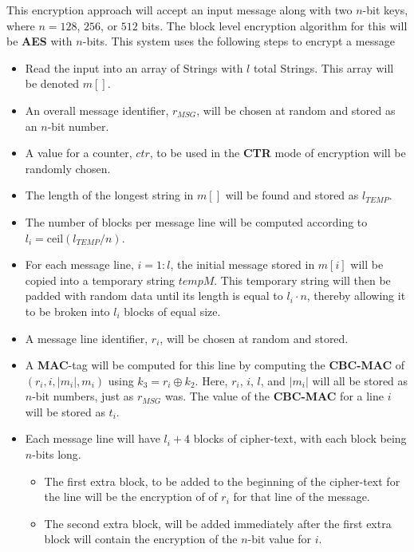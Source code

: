 \documentclass[../midterm.tex]{subfiles}
\begin{document}
\begin{flushleft}





  This encryption approach will accept an input message along with two $n$-bit keys, where $n = 128$, $256$, or $512$ bits.  The block level encryption algorithm for this will be \textbf{AES} with $n$-bits.  This system uses the following steps to encrypt a message

\begin{itemize}
	\item Read the input into an array of Strings with $l$ total Strings.  This array will be denoted $m \left[ \right]$.
	\item An overall message identifier, $r_{MSG}$, will be chosen at random and stored as an $n$-bit number.
	\item A value for a counter, $ctr$, to be used in the \textbf{CTR} mode of encryption will be randomly chosen.
	\item The length of the longest string in $m \left[ \right]$ will be found and stored as $l_{TEMP}$.
	\item The number of blocks per message line will be computed according to $l_i = \text{ceil} \left( l_{TEMP} / n \right)$.
	\item For each message line, $i = 1:l$, the initial message stored in $m \left[ i \right]$ will be copied into a temporary string $tempM$.  This temporary string will then be padded with random data until its length is equal to $l_i \cdot n$, thereby allowing it to be broken into $l_i$ blocks of equal size.
	\item A message line identifier, $r_i$, will be chosen at random and stored.
	\item A \textbf{MAC}-tag will be computed for this line by computing the \textbf{CBC-MAC} of $\left( r_i, i, \left| m_i \right|, m_i \right)$ using $k_3 = r_i \oplus k_2$.  Here, $r_i$, $i$, $l$, and $\left| m_i \right|$ will all be stored as $n$-bit numbers, just as $r_{MSG}$ was.  The value of the \textbf{CBC-MAC} for a line $i$ will be stored as $t_i$.
	\item Each message line will have $l_i + 4$ blocks of cipher-text, with each block being $n$-bits long. 
	\begin{itemize}
		\item The first extra block, to be added to the beginning of the cipher-text for the line will be the encryption of of $r_i$ for that line of the message.
		\item The second extra block, will be added immediately after the first extra block will contain the encryption of the $n$-bit value for $i$.

\end{itemize}
\end{itemize}
\end{flushleft}
\end{document}
